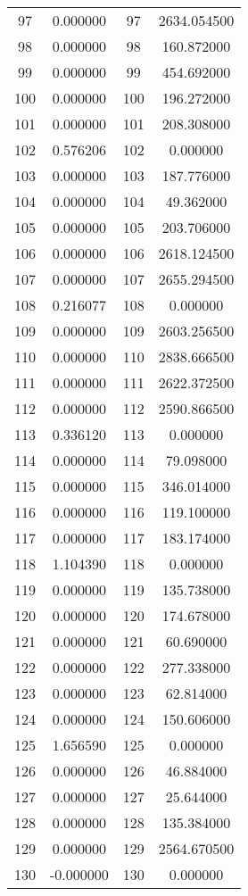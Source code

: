 \documentclass[12pt]{article}
\begin{document}
\begin{longtable}{@{}cccc@{}}
97 & 0.000000 & 97 & 2634.054500 \\
98 & 0.000000 & 98 & 160.872000 \\
99 & 0.000000 & 99 & 454.692000 \\
100 & 0.000000 & 100 & 196.272000 \\
101 & 0.000000 & 101 & 208.308000 \\
102 & 0.576206 & 102 & 0.000000 \\
103 & 0.000000 & 103 & 187.776000 \\
104 & 0.000000 & 104 & 49.362000 \\
105 & 0.000000 & 105 & 203.706000 \\
106 & 0.000000 & 106 & 2618.124500 \\
107 & 0.000000 & 107 & 2655.294500 \\
108 & 0.216077 & 108 & 0.000000 \\
109 & 0.000000 & 109 & 2603.256500 \\
110 & 0.000000 & 110 & 2838.666500 \\
111 & 0.000000 & 111 & 2622.372500 \\
112 & 0.000000 & 112 & 2590.866500 \\
113 & 0.336120 & 113 & 0.000000 \\
114 & 0.000000 & 114 & 79.098000 \\
115 & 0.000000 & 115 & 346.014000 \\
116 & 0.000000 & 116 & 119.100000 \\
117 & 0.000000 & 117 & 183.174000 \\
118 & 1.104390 & 118 & 0.000000 \\
119 & 0.000000 & 119 & 135.738000 \\
120 & 0.000000 & 120 & 174.678000 \\
121 & 0.000000 & 121 & 60.690000 \\
122 & 0.000000 & 122 & 277.338000 \\
123 & 0.000000 & 123 & 62.814000 \\
124 & 0.000000 & 124 & 150.606000 \\
125 & 1.656590 & 125 & 0.000000 \\
126 & 0.000000 & 126 & 46.884000 \\
127 & 0.000000 & 127 & 25.644000 \\
128 & 0.000000 & 128 & 135.384000 \\
129 & 0.000000 & 129 & 2564.670500 \\
130 & -0.000000 & 130 & 0.000000 \\

\end{longtable}
\end{document}

